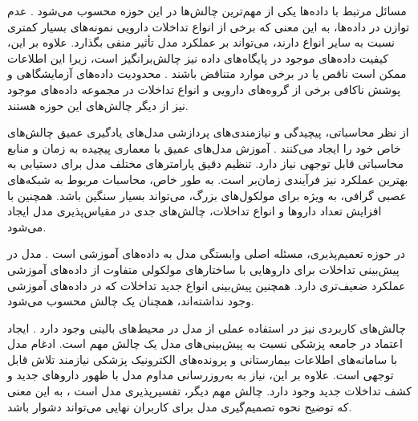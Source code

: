 مسائل مرتبط با داده‌ها یکی از مهم‌ترین چالش‌ها در این حوزه محسوب می‌شود \cite{ref_wang2017}. عدم توازن در داده‌ها، به این معنی که برخی از انواع تداخلات دارویی نمونه‌های بسیار کمتری نسبت به سایر انواع دارند، می‌تواند بر عملکرد مدل تأثیر منفی بگذارد. علاوه بر این، کیفیت داده‌های موجود در پایگاه‌های داده نیز چالش‌برانگیز است، زیرا این اطلاعات ممکن است ناقص یا در برخی موارد متناقض باشند \cite{ref_deng2020}. محدودیت داده‌های آزمایشگاهی و پوشش ناکافی برخی از گروه‌های دارویی و انواع تداخلات در مجموعه داده‌های موجود نیز از دیگر چالش‌های این حوزه هستند.

از نظر محاسباتی، پیچیدگی و نیازمندی‌های پردازشی مدل‌های یادگیری عمیق چالش‌های خاص خود را ایجاد می‌کنند \cite{ref_he2023}. آموزش مدل‌های عمیق با معماری پیچیده به زمان و منابع محاسباتی قابل توجهی نیاز دارد. تنظیم دقیق پارامترهای مختلف مدل برای دستیابی به بهترین عملکرد نیز فرآیندی زمان‌بر است. به طور خاص، محاسبات مربوط به شبکه‌های عصبی گرافی، به ویژه برای مولکول‌های بزرگ، می‌تواند بسیار سنگین باشد. همچنین با افزایش تعداد داروها و انواع تداخلات، چالش‌های جدی در مقیاس‌پذیری مدل ایجاد می‌شود.

در حوزه تعمیم‌پذیری، مسئله اصلی وابستگی مدل به داده‌های آموزشی است \cite{ref_dai2020}. مدل در پیش‌بینی تداخلات برای داروهایی با ساختارهای مولکولی متفاوت از داده‌های آموزشی عملکرد ضعیف‌تری دارد. همچنین پیش‌بینی انواع جدید تداخلات که در داده‌های آموزشی وجود نداشته‌اند، همچنان یک چالش محسوب می‌شود.

چالش‌های کاربردی نیز در استفاده عملی از مدل در محیط‌های بالینی وجود دارد \cite{ref_cascorbi2012}. ایجاد اعتماد در جامعه پزشکی نسبت به پیش‌بینی‌های مدل یک چالش مهم است. ادغام مدل با سامانه‌های اطلاعات بیمارستانی و پرونده‌های الکترونیک پزشکی نیازمند تلاش قابل توجهی است. علاوه بر این، نیاز به به‌روزرسانی مداوم مدل با ظهور داروهای جدید و کشف تداخلات جدید وجود دارد. چالش مهم دیگر، تفسیرپذیری مدل است \cite{ref_ryu2018}، به این معنی که توضیح نحوه تصمیم‌گیری مدل برای کاربران نهایی می‌تواند دشوار باشد.
